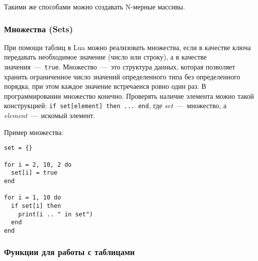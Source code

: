 Такими же способами можно создавать N-мерные массивы.

\subsubsection{Множества (Sets)}


При помощи таблиц в Lua можно реализовать множества, если в качестве ключа передавать необходимое значение (число или строку), 
а в качестве значения~---~\lstinline{true}. Множество~---~это структура данных, которая позволяет хранить ограниченное число значений определенного типа без определенного порядка, при этом каждое значение встречаеися ровно один раз. В программировании множество конечно. Проверять наличие элемента можно такой конструкцией: \lstinline{if set[element] then ... end}, где \emph{set}~---~множество, а \emph{element}~---~искомый элемент.

Пример множества:

\begin{lstlisting}
set = {}

for i = 2, 10, 2 do
  set[i] = true
end

for i = 1, 10 do
  if set[i] then
    print(i .. " in set")  
  end
end
\end{lstlisting}

\subsubsection{Функции для работы с таблицами}

